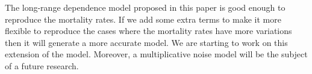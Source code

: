\documentclass[smallextended]{svjour3}
\begin{document}
The long-range dependence model proposed in this paper is good
enough to reproduce the mortality rates. If we add some extra terms to make it
more flexible to reproduce the cases where the mortality rates have more
variations then it will generate a more accurate model. We are starting to work
on this extension of the model. Moreover, a multiplicative noise model will be
the subject of a future research.\\



{}










\end{document}
